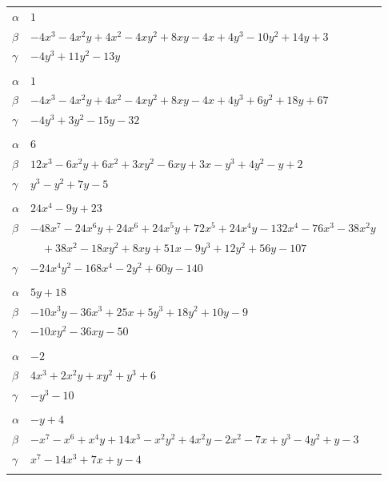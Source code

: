 \documentclass[11pt]{article}
\begin{document}
\begin{longtable}{@{}ll@{}}
$\alpha$ & $1$\\
$\beta$ & $-4x^{3}-4x^{2}y+4x^{2}-4xy^{2}+8xy-4x+4y^{3}-10y^{2}+14y+3$\\
$\gamma$ & $-4y^{3}+11y^{2}-13y$\\
\addlinespace[3pt]
\multicolumn{2}{@{}l}{$\{i,j\}=\{1,15\}$, $k_{ij}=2^{2}\cdot 5^{2}$}\\
$\alpha$ & $1$\\
$\beta$ & $-4x^{3}-4x^{2}y+4x^{2}-4xy^{2}+8xy-4x+4y^{3}+6y^{2}+18y+67$\\
$\gamma$ & $-4y^{3}+3y^{2}-15y-32$\\
\addlinespace[3pt]
\multicolumn{2}{@{}l}{$\{i,j\}=\{2,27\}$, $k_{ij}=2\cdot 3^{2}$}\\
$\alpha$ & $6$\\
$\beta$ & $12x^{3}-6x^{2}y+6x^{2}+3xy^{2}-6xy+3x-y^{3}+4y^{2}-y+2$\\
$\gamma$ & $y^{3}-y^{2}+7y-5$\\
\addlinespace[3pt]
\multicolumn{2}{@{}l}{$\{i,j\}=\{3,24\}$, $k_{ij}=2^{3}\cdot 7$}\\
$\alpha$ & $24x^{4}-9y+23$\\
$\beta$ & $-48x^{7}-24x^{6}y+24x^{6}+24x^{5}y+72x^{5}+24x^{4}y-132x^{4}-76x^{3}-38x^{2}y$\\
 & $\quad +38x^{2}-18xy^{2}+8xy+51x-9y^{3}+12y^{2}+56y-107$\\
$\gamma$ & $-24x^{4}y^{2}-168x^{4}-2y^{2}+60y-140$\\
\addlinespace[3pt]
\multicolumn{2}{@{}l}{$\{i,j\}=\{13,16\}$, $k_{ij}=2\cdot 3^{2}$}\\
$\alpha$ & $5y+18$\\
$\beta$ & $-10x^{3}y-36x^{3}+25x+5y^{3}+18y^{2}+10y-9$\\
$\gamma$ & $-10xy^{2}-36xy-50$\\
\addlinespace[3pt]
\multicolumn{2}{@{}l}{$\{i,j\}=\{13,27\}$, $k_{ij}=2\cdot 3^{2}$}\\
$\alpha$ & $-2$\\
$\beta$ & $4x^{3}+2x^{2}y+xy^{2}+y^{3}+6$\\
$\gamma$ & $-y^{3}-10$\\
\addlinespace[3pt]
\multicolumn{2}{@{}l}{$\{i,j\}=\{16,7\}$, $k_{ij}=2^{2}$}\\
$\alpha$ & $-y+4$\\
$\beta$ & $-x^{7}-x^{6}+x^{4}y+14x^{3}-x^{2}y^{2}+4x^{2}y-2x^{2}-7x+y^{3}-4y^{2}+y-3$\\
$\gamma$ & $x^{7}-14x^{3}+7x+y-4$\\
\addlinespace[3pt]

\end{longtable}
\end{document}
